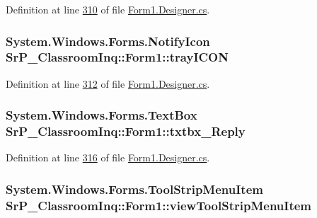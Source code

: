 \-Definition at line \hyperlink{_form1_8_designer_8cs_source_l00310}{310} of file \hyperlink{_form1_8_designer_8cs_source}{\-Form1.\-Designer.\-cs}.

\hypertarget{class_sr_p___classroom_inq_1_1_form1_aebfca6922fa8221276d0547615f5b93a}{
\subsubsection[{tray\-I\-C\-O\-N}]{\setlength{\rightskip}{0pt plus 5cm}\-System.\-Windows.\-Forms.\-Notify\-Icon {\bf \-Sr\-P\-\_\-\-Classroom\-Inq\-::\-Form1\-::tray\-I\-C\-O\-N}}}
\label{class_sr_p___classroom_inq_1_1_form1_aebfca6922fa8221276d0547615f5b93a}


\-Definition at line \hyperlink{_form1_8_designer_8cs_source_l00312}{312} of file \hyperlink{_form1_8_designer_8cs_source}{\-Form1.\-Designer.\-cs}.

\hypertarget{class_sr_p___classroom_inq_1_1_form1_ac823af7ed5a9a4e3fde06b7ab90faa0e}{
\subsubsection[{txtbx\-\_\-\-Reply}]{\setlength{\rightskip}{0pt plus 5cm}\-System.\-Windows.\-Forms.\-Text\-Box {\bf \-Sr\-P\-\_\-\-Classroom\-Inq\-::\-Form1\-::txtbx\-\_\-\-Reply}}}
\label{class_sr_p___classroom_inq_1_1_form1_ac823af7ed5a9a4e3fde06b7ab90faa0e}


\-Definition at line \hyperlink{_form1_8_designer_8cs_source_l00316}{316} of file \hyperlink{_form1_8_designer_8cs_source}{\-Form1.\-Designer.\-cs}.

\hypertarget{class_sr_p___classroom_inq_1_1_form1_a32535c4c872410c0983e3f8978cdbb1e}{
\subsubsection[{view\-Tool\-Strip\-Menu\-Item}]{\setlength{\rightskip}{0pt plus 5cm}\-System.\-Windows.\-Forms.\-Tool\-Strip\-Menu\-Item {\bf \-Sr\-P\-\_\-\-Classroom\-Inq\-::\-Form1\-::view\-Tool\-Strip\-Menu\-Item}}}
\label{class_sr_p___classroom_inq_1_1_form1_a32535c4c872410c0983e3f8978cdbb1e}


